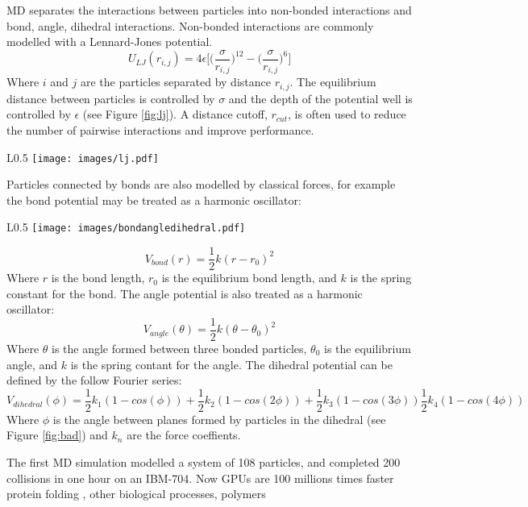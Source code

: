 MD separates the interactions between particles into non-bonded interactions and bond, angle, dihedral interactions.
Non-bonded interactions are commonly modelled with a Lennard-Jones potential.
$$ U_{LJ}(r_{i,j}) = 4\epsilon\big[\big(\frac{\sigma}{r_{i,j}}\big)^{12}-\big(\frac{\sigma}{r_{i,j}}\big)^{6}\big]$$
Where $i$ and $j$ are the particles separated by distance $r_{i,j}$.
The equilibrium distance between particles is controlled by $\sigma$ and the depth of the potential well is controlled by $\epsilon$ (see Figure \ref{fig:lj}).
A distance cutoff, $r_{cut}$, is often used to reduce the number of pairwise interactions and improve performance.

\begin{wrapfigure}{L}{0.5\linewidth}
    \centering
    \texttt{[image: images/lj.pdf]}
    \caption{The Lennard-Jones potential with relevant distances labelled}
    \label{fig:lj}
\end{wrapfigure}

Particles connected by bonds are also modelled by classical forces, for example the bond potential may be treated as a harmonic oscillator:

\begin{wrapfigure}{L}{0.5\linewidth}
    \centering
    \texttt{[image: images/bondangledihedral.pdf]}
    \caption{Bonded interactions: bond (top left), angle (top right), and dihedral (bottom). Image taken from \cite{punma}.}
    \label{fig:bad}
\end{wrapfigure}

$$V_{bond}(r) = \frac{1}{2}k(r-r_{0})^{2}$$
Where $r$ is the bond length, $r_{0}$ is the equilibrium bond length, and $k$ is the spring constant for the bond.
The angle potential is also treated as a harmonic oscillator:
$$V_{angle}(\theta)=\frac{1}{2}k(\theta-\theta_{0})^{2}$$
Where $\theta$ is the angle formed between three bonded particles, $\theta_{0}$ is the equilibrium angle, and $k$ is the spring contant for the angle.
The dihedral potential can be defined by the follow Fourier series:
$$V_{dihedral}(\phi)=\frac{1}{2}k_{1}(1-cos(\phi))+\frac{1}{2}k_{2}(1-cos(2\phi))+\frac{1}{2}k_{3}(1-cos(3\phi))\frac{1}{2}k_{4}(1-cos(4\phi))$$
Where $\phi$ is the angle between planes formed by particles in the dihedral (see Figure \ref{fig:bad}) and $k_{n}$ are the force coeffients.

The first MD simulation modelled a system of 108 particles, and completed 200 collisions in one hour on an IBM-704\cite{Alder1957}.
Now GPUs are 100 millions times faster
protein folding \cite{levitt75}, other biological processes, polymers \cite{Gartner2019a}


